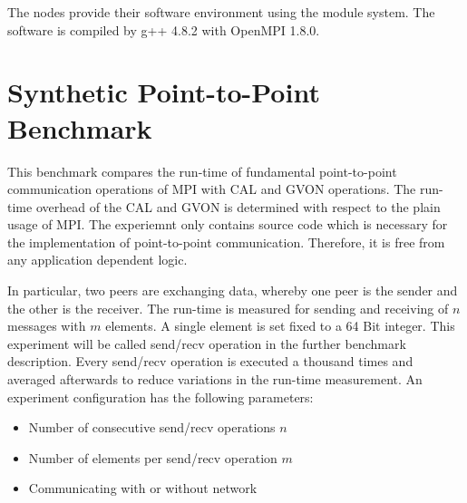 

The nodes provide their software environment using the module system.
The software is compiled by g++ 4.8.2 with OpenMPI 1.8.0.

\section{Synthetic Point-to-Point Benchmark}
This benchmark compares the run-time of fundamental point-to-point
communication operations of MPI with CAL and GVON operations.  The
run-time overhead of the CAL and GVON is determined with respect to
the plain usage of MPI.  The experiemnt only contains source code
which is necessary for the implementation of point-to-point
communication. Therefore, it is free from any application dependent
logic.

In particular, two peers are exchanging data, whereby one peer is the
sender and the other is the receiver. The run-time is measured for
sending and receiving of $n$ messages with $m$ elements.  A single
element is set fixed to a 64 Bit integer.  This experiment will be
called send/recv operation in the further benchmark description. Every
send/recv operation is executed a thousand times and averaged
afterwards to reduce variations in the run-time measurement. An
experiment configuration has the following parameters:

\begin{itemize}
  \item Number of consecutive send/recv operations $n$
  \item Number of elements per send/recv operation $m$
  \item Communicating with or without network
\end{itemize}

